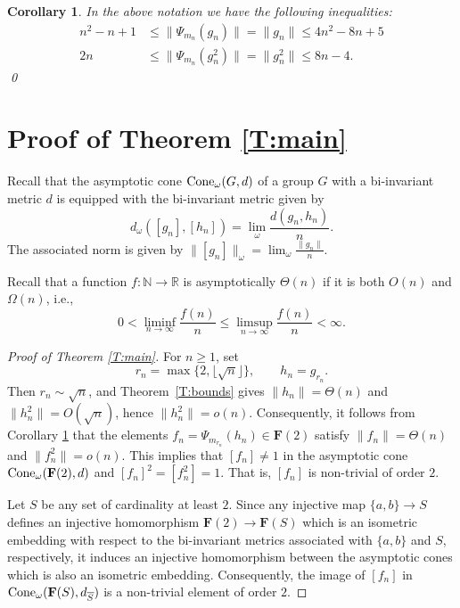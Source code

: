 \documentclass[12pt,reqno,a4paper]{article}
\newtheorem{corollary}[theorem]{Corollary}
\theoremstyle{definition}
\theoremstyle{remark}
\numberwithin{equation}{section}
\numberwithin{figure}{section}
\newcommand{\B}[1]{{\mathbf #1}}
\begin{document}
\begin{corollary}\label{C:F2}
In the above notation we have the following inequalities:
\begin{align*}
n^2-n+1 &\leq \|\Psi_{m_n}(g_n)\| = \|g_n\| \leq 4n^2-8n+5\\
2n &\leq \|\Psi_{m_n}(g_n^2)\|= \|g_n^2\| \leq 8n-4.
\end{align*}
\qed
\end{corollary}


\section{Proof of Theorem \ref{T:main}}

Recall that the asymptotic cone ${\rm Cone}_{\omega}(G,d)$ of
a group $G$ with a bi-invariant metric $d$ is equipped
with the bi-invariant metric given by
$$
d_{\omega}([g_n],[h_n]) = \lim_{\omega}\frac{d(g_n,h_n)}{n}.
$$
The associated norm is given by $\|[g_n]\|_{\omega}=\lim_{\omega}\frac{\|g_n\|}{n}$.


Recall that a function $f \colon \mathbb N \to \mathbb R$ is asymptotically $\Theta(n)$ if it is both $O(n)$ and $\Omega(n)$, i.e.,
\[
0 < \liminf_{n \to \infty} \frac{f(n)}{n} \leq \limsup_{n \to \infty} \frac{f(n)}{n} < \infty.
\]


\begin{proof}[Proof of Theorem \ref{T:main}]
For $n\geq 1$, set
\[
r_n=\max\{2,\lfloor\sqrt n\rfloor\},\qquad h_n=g_{r_n}.
\]
Then $r_n\sim\sqrt n$, and Theorem~\ref{T:bounds} gives
$\|h_n\|=\Theta(n)$ and $\|h_n^2\|=O(\sqrt n)$, hence $\|h_n^2\|=o(n)$.
Consequently, it follows from Corollary \ref{C:F2} that
the elements $f_n=\Psi_{m_{r_n}}(h_n)\in \B F(2)$ satisfy
$\|f_n\| =\Theta(n)$ and $\|f_n^2\| =o(n)$. 
This implies
that $[f_n]\neq 1$ in the asymptotic cone ${\rm Cone}_{\omega}(\B F(2),d)$
and $[f_n]^2=[f^2_n]=1$. That is, $[f_n]$ is non-trivial of order $2$.

Let $S$ be any set of cardinality at least $2$.
Since any injective map $\{a,b\}\to S$ defines an injective homomorphism 
$\B F(2) \to \B F(S)$
which is an isometric embedding
with respect to the bi-invariant metrics associated
with $\{a,b\}$ and $S$, respectively, it induces an injective homomorphism between
the asymptotic cones which is also an isometric embedding. Consequently,
the image of $[f_n]$ in ${\rm Cone}_{\omega}(\B F(S),d_{\overline{S}})$
is a non-trivial element of order $2$.
\end{proof}
\end{document}
